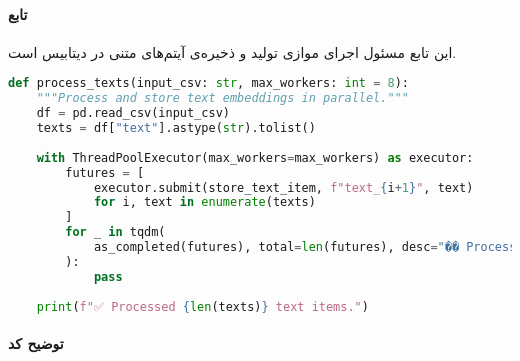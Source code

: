 \documentclass{article}
\begin{document}
\paragraph{تابع }

این تابع مسئول اجرای موازی تولید  و ذخیره‌ی آیتم‌های متنی در دیتابیس است.

\begin{latin}
\begin{lstlisting}[language=Python]
def process_texts(input_csv: str, max_workers: int = 8):
    """Process and store text embeddings in parallel."""
    df = pd.read_csv(input_csv)
    texts = df["text"].astype(str).tolist()
    
    with ThreadPoolExecutor(max_workers=max_workers) as executor:
        futures = [
            executor.submit(store_text_item, f"text_{i+1}", text)
            for i, text in enumerate(texts)
        ]
        for _ in tqdm(
            as_completed(futures), total=len(futures), desc="�� Processing texts"
        ):
            pass
    
    print(f"✅ Processed {len(texts)} text items.")
\end{lstlisting}
\end{latin}

\paragraph{توضیح کد }
\end{document}
